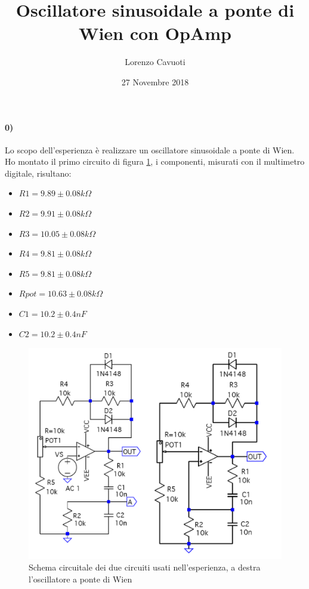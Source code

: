 \documentclass{article}
\date{27 Novembre 2018}
\author{Lorenzo Cavuoti}
\title{Oscillatore sinusoidale a ponte di Wien con OpAmp}
\begin{document}
	\maketitle
	
	\paragraph{0)}
	Lo scopo dell'esperienza è realizzare un oscillatore sinusoidale a ponte di Wien. Ho montato il primo circuito di figura \ref{fig:circuiti}, i componenti, misurati con il multimetro digitale, risultano:
	\begin{itemize}
		\item $R1=9.89\pm0.08k\Omega$
		\item $R2=9.91\pm0.08k\Omega$
		\item $R3=10.05\pm0.08k\Omega$
		\item $R4=9.81\pm0.08k\Omega$
		\item $R5=9.81\pm0.08k\Omega$
		\item $Rpot=10.63\pm0.08k\Omega$
		\item $C1=10.2\pm0.4nF$
		\item $C2=10.2\pm0.4nF$
	\end{itemize}

	\begin{figure}
		\centering
		\includegraphics[width=0.9\linewidth]{figure/circuiti}
		\caption{Schema circuitale dei due circuiti usati nell'esperienza, a destra l'oscillatore a ponte di Wien}
		\label{fig:circuiti}
	\end{figure}
\end{document}
